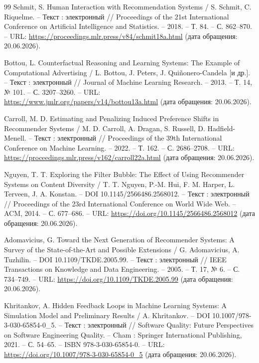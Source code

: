 \begin{thebibliography}{99}
Schmit, S. Human Interaction with Recommendation Systems / S. Schmit, C. Riquelme. -- Текст : электронный // Proceedings of the 21st International Conference on Artificial Intelligence and Statistics. -- 2018. -- Т. 84. -- С. 862--870. -- URL: \url{https://proceedings.mlr.press/v84/schmit18a.html} (дата обращения: 20.06.2026).

Bottou, L. Counterfactual Reasoning and Learning Systems: The Example of Computational Advertising / L. Bottou, J. Peters, J. Quiñonero-Candela [и др.]. -- Текст : электронный // Journal of Machine Learning Research. -- 2013. -- Т. 14, № 101. -- С. 3207--3260. -- URL: \url{https://www.jmlr.org/papers/v14/bottou13a.html} (дата обращения: 20.06.2026).

Carroll, M. D. Estimating and Penalizing Induced Preference Shifts in Recommender Systems / M. D. Carroll, A. Dragan, S. Russell, D. Hadfield-Menell. -- Текст : электронный // Proceedings of the 39th International Conference on Machine Learning. -- 2022. -- Т. 162. -- С. 2686--2708. -- URL: \url{https://proceedings.mlr.press/v162/carroll22a.html} (дата обращения: 20.06.2026).

Nguyen, T. T. Exploring the Filter Bubble: The Effect of Using Recommender Systems on Content Diversity / T. T. Nguyen, P.-M. Hui, F. M. Harper, L. Terveen, J. A. Konstan. -- DOI 10.1145/2566486.2568012. -- Текст : электронный // Proceedings of the 23rd International Conference on World Wide Web. -- ACM, 2014. -- С. 677--686. -- URL: \url{https://doi.org/10.1145/2566486.2568012} (дата обращения: 20.06.2026).

Adomavicius, G. Toward the Next Generation of Recommender Systems: A Survey of the State-of-the-Art and Possible Extensions / G. Adomavicius, A. Tuzhilin. -- DOI 10.1109/TKDE.2005.99. -- Текст : электронный // IEEE Transactions on Knowledge and Data Engineering. -- 2005. -- Т. 17, № 6. -- С. 734--749. -- URL: \url{https://doi.org/10.1109/TKDE.2005.99} (дата обращения: 20.06.2026).

Khritankov, A. Hidden Feedback Loops in Machine Learning Systems: A Simulation Model and Preliminary Results / A. Khritankov. -- DOI 10.1007/978-3-030-65854-0\_5. -- Текст : электронный // Software Quality: Future Perspectives on Software Engineering Quality. -- Cham : Springer International Publishing, 2021. -- С. 54--65. -- ISBN 978-3-030-65854-0. -- URL: \url{https://doi.org/10.1007/978-3-030-65854-0_5} (дата обращения: 20.06.2026).


\end{thebibliography}
